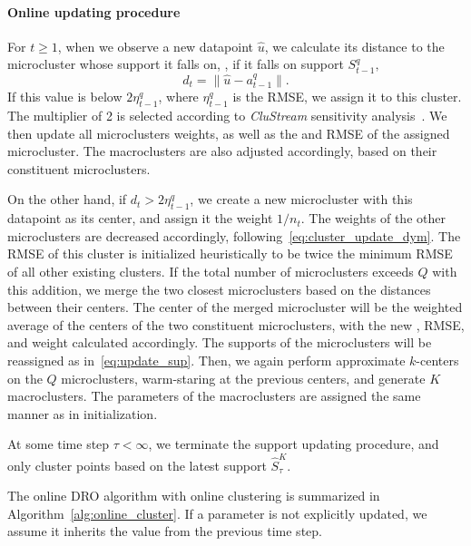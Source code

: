 
\paragraph{Online updating procedure}
For $t \geq 1$, when we observe a new datapoint $\hat{u}$, we calculate its distance to the microcluster whose support it falls on, \ie, if it falls on support $S^q_{t-1},$
$$d_t = \|\hat{u} - a^q_{t-1}\|.$$
If this value is below $2\eta^q_{t-1}$, where $\eta^q_{t-1}$ is the RMSE, we assign it to this cluster. The multiplier of 2 is selected according to {\it CluStream} sensitivity analysis~\cite[Section 6.4]{clustream}. We then update all microclusters weights, as well as the  and RMSE of the assigned microcluster. The macroclusters are also adjusted accordingly, based on their constituent microclusters. 

On the other hand, if $d_t > 2\eta^q_{t-1}$, we create a new microcluster with this datapoint as its center, and assign it the weight $1/n_t$. The weights of the other microclusters are decreased accordingly, following~\eqref{eq:cluster_update_dym}. The RMSE of this cluster is initialized heuristically to be twice the minimum RMSE of all other existing clusters. If the total number of microclusters exceeds $Q$ with this addition, we merge the two closest microclusters based on the distances between their centers. The center of the merged microcluster will be the weighted average of the centers of the two constituent microclusters, with the new , RMSE, and weight calculated accordingly. The supports of the microclusters will be reassigned as in~\eqref{eq:update_sup}. 
Then, we again perform approximate $k$-centers on the $Q$ microclusters, warm-staring at the previous centers, and generate $K$ macroclusters. The parameters of the macroclusters are assigned the same manner as in initialization. 

At some time step $\tau < \infty$, we terminate the support updating procedure, and only cluster points based on the latest support $\hat{S}^K_\tau$. 

The online \gls{DRO} algorithm with online clustering is summarized in Algorithm~\ref{alg:online_cluster}. If a parameter is not explicitly updated, we assume it inherits the value from the previous time step. 

